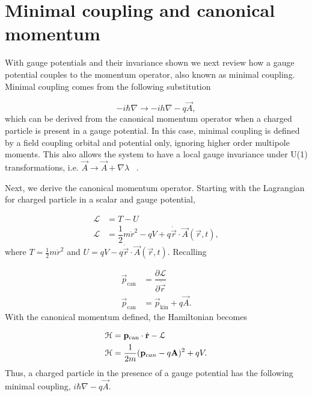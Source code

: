 \section{Minimal coupling and canonical momentum}
With gauge potentials and their invariance shown we next review how a gauge potential couples to the momentum operator, also known as minimal coupling.
Minimal coupling comes from the following substitution

\begin{equation}
  -i\hbar\nabla \rightarrow -ih\nabla - q\vec{A},
\end{equation}
which can be derived from the canonical momentum operator when a charged particle is present in a gauge potential.
In this case, minimal coupling is defined by a field coupling orbital and potential only, ignoring higher order multipole moments.
This also allows the system to have a local gauge invariance under U(1) transformations, i.e.
$\vec{A} \rightarrow \vec{A} + \nabla\lambda$  ~\cite{altlandCondensedMatterField2023}.

Next, we derive the canonical momentum operator.
Starting with the Lagrangian for charged particle in a scalar and gauge potential,

\begin{align}
  \mathcal{L} &= T- U \nonumber \\
  \mathcal{L} &= \dfrac{1}{2} m \dot{r}^2 - qV + q \dot{\vec{r}} \cdot \vec{A}(\vec{r},t),
\end{align}
where $T = \tfrac{1}{2} m \dot{r}^2$ and $U = qV - q \dot{\vec{r}} \cdot \vec{A}(\vec{r},t)$.
Recalling

\begin{align}
  \vec{p}_{\text{can}} &= \dfrac{\partial\mathcal{L}}{\partial \dot{\vec{r}}} \nonumber \\
  \vec{p}_{\text{can}} &= \vec{p}_{\text{kin}} + q \vec{A}.
  \label{eq:canonical-momentum}
\end{align}
With the canonical momentum defined, the Hamiltonian becomes

\begin{align}
  \mathcal{H} &= \mathbf{p}_{\text{can}} \cdot \dot{\mathbf{r}} - \mathcal{L} \nonumber \\
  \mathcal{H} &= \dfrac{1}{2m} (\mathbf{p}_{can} - q \mathbf{A})^2 + q V.
\end{align}
Thus, a charged particle in the presence of a gauge potential has the following minimal coupling,
$i\hbar\nabla - q\vec{A}$.

